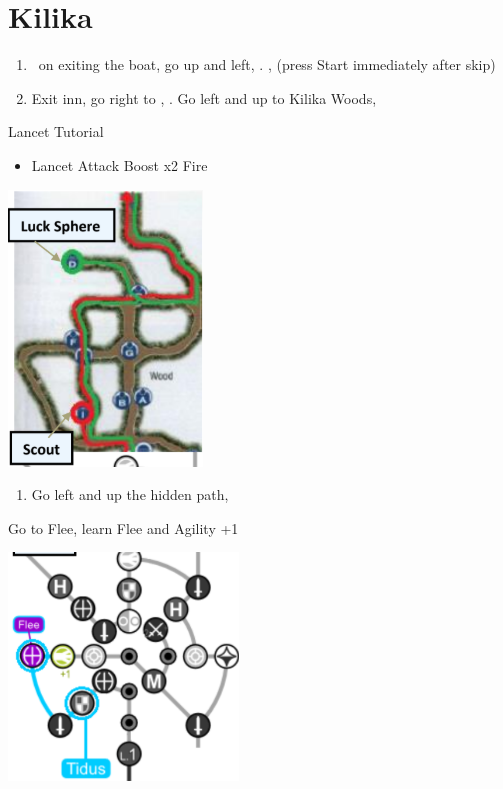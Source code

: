 \chapter{Kilika}

\begin{enumerate}
  \item \sd\ on exiting the boat, go up and left, \sd. \skippablefmv[2:00], (press Start immediately after skip) \sd
  \item Exit inn, go right to \wakka, \sd. Go left and up to Kilika Woods, \sd
\end{enumerate}
\begin{battle}{Lancet Tutorial}
  \begin{itemize}
    \item \sd
          \kimahrif Lancet
          \tidusf Attack
          \summon{\valefor}
          \valeforf Boost x2
          \valeforf Fire
  \end{itemize}
\end{battle}
\includegraphics{graphics/kilikamap}
\begin{enumerate}[resume]
  \item Go left and up the hidden path, 
\end{enumerate}
\begin{spheregrid}
  \begin{itemize}
    \tidusf Go to Flee, learn Flee and Agility +1
  \end{itemize}
  \includegraphics{graphics/tidusflee}
\end{spheregrid}
